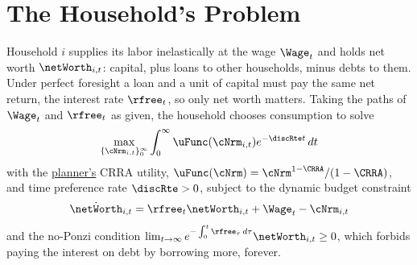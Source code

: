 \documentclass{econark}
\begin{document}
\section{The Household's Problem}

Household $i$ supplies its labor inelastically at the wage $\Wage_{t}$ and holds net worth $\netWorth_{i,t}$: capital, plus loans to other households, minus debts to them. Under perfect foresight a loan and a unit of capital must pay the same net return, the interest rate $\rfree_{t}$, so only net worth matters. Taking the paths of $\Wage_{t}$ and $\rfree_{t}$ as given, the household chooses consumption to solve
\begin{equation}
  \max_{\{\cNrm_{i,t}\}_{0}^{\infty}} \int_{0}^{\infty} \uFunc(\cNrm_{i,t}) e^{-\discRte t}\,dt \label{eq:DecRCK-maxprob}
\end{equation}
with the \href{https://intertemporal-choice.github.io/content/growth/ramseycasskoopmans/\#eq-rck-maxprob}{planner's} CRRA utility, $\uFunc(\cNrm) = \cNrm^{1-\CRRA}/(1-\CRRA)$, and time preference rate $\discRte > 0$, subject to the dynamic budget constraint
\begin{equation}
  \dot{\netWorth}_{i,t} = \rfree_{t}\netWorth_{i,t} + \Wage_{t} - \cNrm_{i,t} \label{eq:DecRCK-dbc}
\end{equation}
and the no-Ponzi condition $\lim_{t \rightarrow \infty} e^{-\int_{0}^{t}\rfree_{\tau}\,d\tau}\netWorth_{i,t} \geq 0$, which forbids paying the interest on debt by borrowing more, forever.
\end{document}
